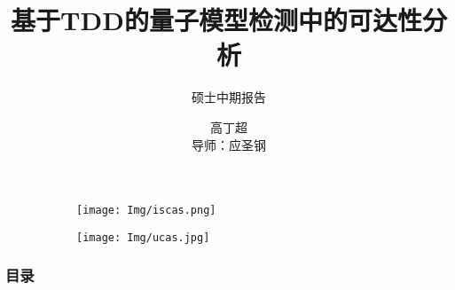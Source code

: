 \documentclass[aspectratio=1610]{ctexbeamer}
\title[中期]{基于TDD的量子模型检测中的可达性分析}
\subtitle{硕士中期报告}
\author[Gcc]{高丁超\\ 导师：应圣钢}
\institute[ISCAS]{中国科学院软件研究所}
\begin{document}
\begin{frame}[plain]
    \titlepage
    \begin{figure}
        \centering
        \begin{subfigure}[c]{0.4\textwidth}
            \centering
            \texttt{[image: Img/iscas.png]}
        \end{subfigure}
        \qquad
        \begin{subfigure}[c]{0.4\textwidth}
            \centering
            \texttt{[image: Img/ucas.jpg]}
        \end{subfigure}
    \end{figure}
\end{frame}
\begin{frame}
    \frametitle{目录}
    \tableofcontents
\end{frame}
\end{document}
